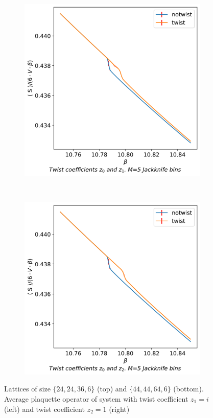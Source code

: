 \documentclass[english,twoside,openright]{UH_TCM_MSc}
\begin{document}
\begin{figure}[htb]
\begin{subfigure}[t]{0.5\textwidth}
    \end{subfigure}\vspace{1.5cm}
    \begin{subfigure}[t]{0.5\textwidth}
        \centering
        \includegraphics[width=\textwidth]{final_plots/action_volume_comparison/action_44_44_64.pdf}
    \end{subfigure}%
    ~
    \begin{subfigure}[t]{0.5\textwidth}
        \centering
        \includegraphics[width=\textwidth]{final_plots/action_volume_comparison/aciton_44_44_64_0-2.pdf}
    \end{subfigure}
    \caption{Lattices of size $\{24,24,36,6\}$ (top) and $\{44,44,64,6\}$ (bottom). Average plaquette operator of system with twist coefficient $z_1 = i$ (left) and twist coefficient $z_2 = 1$ (right)} 
    \label{fig:actions}
\end{figure}
\end{document}
